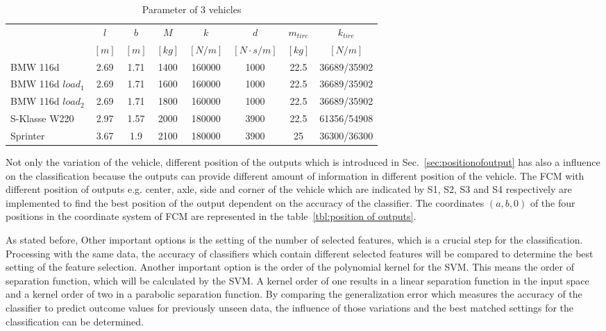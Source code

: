  \begin{table}
 \centering
 \caption{Parameter of 3 vehicles}
 \label{tbl:different vehicle}
 \begin{tabular}{lccccccc}
 \hline
 & $l$ & $b$ & $M$ & $k$ & $d$ & $m_{tire}$ & $k_{tire}$ \\ 
 & $[m]$ & $[m]$ & $[kg]$ & $[N/m]$ & $[N\cdot s/m]$ & $[kg]$ & $[N/m]$ \\ \hline
 BMW 116d & 2.69 & 1.71 & 1400 & 160000 & 1000 & 22.5 & 36689/35902 \\
 BMW 116d $load_1$ & 2.69 & 1.71 & 1600 & 160000 & 1000 & 22.5 & 36689/35902 \\ 
 BMW 116d $load_2$ & 2.69 & 1.71 & 1800 & 160000 & 1000 & 22.5 & 36689/35902 \\
 S-Klasse W220 & 2.97 & 1.57 & 2000 & 180000 & 3900 & 22.5 & 61356/54908 \\
 Sprinter & 3.67 & 1.9 & 2100 & 180000 & 3900 & 25 & 36300/36300 \\ \hline
 \end{tabular}
 \end{table}
 
 Not only the variation of the vehicle, different position of the outputs which is introduced in Sec.~\ref{sec:positionofoutput} has also a influence on the classification because the outputs can provide different amount of information in different position of the vehicle.
 The \ac{FCM} with different position of outputs e.g. center, axle, side and corner of the vehicle which are indicated by S1, S2, S3 and S4 respectively are implemented to find the best position of the output dependent on the accuracy of the classifier.
 The coordinates $(a,b,0)$ of the four positions in the coordinate system of \ac{FCM} are represented in the table~\ref{tbl:position of outputs}.
 
 As stated before, Other important options is the setting of the number of selected features, which is a crucial step for the classification.
 Processing with the same data, the accuracy of classifiers which contain different selected features will be compared to determine the best setting of the feature selection.
 Another important option is the order of the polynomial kernel for the \ac{SVM}.
 This means the order of separation function, which will be calculated by the \ac{SVM}.
 A kernel order of one results in a linear separation function in the input space and a kernel order of two in a parabolic separation function.
 By comparing the generalization error which measures the accuracy of the classifier to predict outcome values for previously unseen data, the influence of those variations and the best matched settings for the classification can be determined.